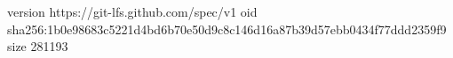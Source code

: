 version https://git-lfs.github.com/spec/v1
oid sha256:1b0e98683c5221d4bd6b70e50d9c8c146d16a87b39d57ebb0434f77ddd2359f9
size 281193
